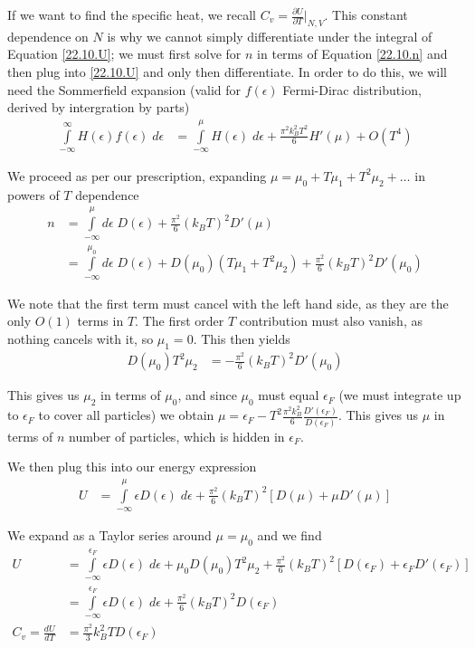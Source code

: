 \documentclass[10pt]{report}
\newcommand{\rd}[2]{\frac{d#1}{d#2}}
\newcommand{\pd}[2]{\frac{\partial #1}{\partial#2}}
\begin{document}
If we want to find the specific heat, we recall $C_v = \pd{U}{T}\Bigg|_{N,V}$. This constant dependence on $N$ is why we cannot simply differentiate under the integral of Equation \eqref{22.10.U}; we must first solve for $n$ in terms of Equation \eqref{22.10.n} and then plug into \eqref{22.10.U} and only then differentiate. In order to do this, we will need the Sommerfield expansion (valid for $f(\epsilon)$ Fermi-Dirac distribution, derived by intergration by parts)
\begin{align}
    \int\limits_{-\infty}^{\infty}H(\epsilon)f(\epsilon)\;d\epsilon &= \int\limits_{-\infty}^{\mu}H(\epsilon)\;d\epsilon + \frac{\pi^2k_B^2T^2}{6}H'(\mu) + O(T^4)
\end{align}

We proceed as per our prescription, expanding $\mu = \mu_0 + T\mu_1 + T^2\mu_2 +\dots$ in powers of $T$ dependence
\begin{align}
    n &= \int\limits_{-\infty}^{\mu}d\epsilon\;D(\epsilon) + \frac{\pi^2}{6}(k_BT)^2D'(\mu)\\
    &= \int\limits_{-\infty}^{\mu_0}d\epsilon\;D(\epsilon) + D(\mu_0)\left( T\mu_1 + T^2\mu_2 \right) + \frac{\pi^2}{6}\left( k_BT \right)^2D'(\mu_0)
\end{align}

We note that the first term must cancel with the left hand side, as they are the only $O(1)$ terms in $T$. The first order $T$ contribution must also vanish, as nothing cancels with it, so $\mu_1 = 0$. This then yields
\begin{align}
    D(\mu_0)T^2\mu_2 &= -\frac{\pi^2}{6}(k_BT)^2 D'(\mu_0)
\end{align}

This gives us $\mu_2$ in terms of $\mu_0$, and since $\mu_0$ must equal $\epsilon_F$ (we must integrate up to $\epsilon_F$ to cover all particles) we obtain $\mu = \epsilon_F - T^2\frac{\pi^2k_B^2}{6}\frac{D'(\epsilon_F)}{D(\epsilon_F)}$. This gives us $\mu$ in terms of $n$ number of particles, which is hidden in $\epsilon_F$.

We then plug this into our energy expression
\begin{align}
    U &= \int\limits_{-\infty}^{\mu}\epsilon D(\epsilon)\;d\epsilon + \frac{\pi^2}{6}(k_BT)^2\left[ D(\mu) + \mu D'(\mu) \right]
\end{align}

We expand as a Taylor series around $\mu = \mu_0$ and we find
\begin{align}
    U &= \int\limits_{-\infty}^{\epsilon_F}\epsilon D(\epsilon)\;d\epsilon + \mu_0 D(\mu_0)T^2\mu_2  + \frac{\pi^2}{6}(k_BT)^2\left[ D(\epsilon_F) + \epsilon_F D'(\epsilon_F) \right]\\
    &= \int\limits_{-\infty}^{\epsilon_F}\epsilon D(\epsilon)\;d\epsilon + \frac{\pi^2}{6}(k_BT)^2D(\epsilon_F)\\
    C_v = \rd{U}{T} &= \frac{\pi^2}{3}k_B^2 T D(\epsilon_F)
\end{align}
\end{document}
